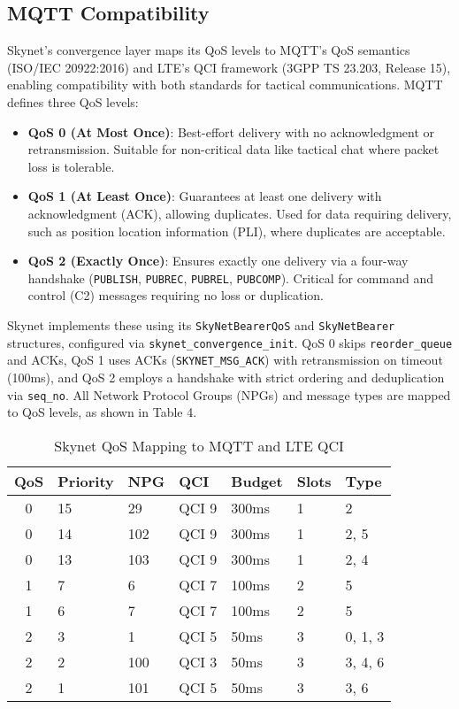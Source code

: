 \documentclass{article}
\begin{document}
\subsection{MQTT Compatibility}
Skynet’s convergence layer maps its QoS levels to MQTT’s QoS semantics (ISO/IEC 20922:2016) and LTE’s
QCI framework (3GPP TS 23.203, Release 15), enabling compatibility with both standards for tactical
communications. MQTT defines three QoS levels:
\begin{itemize}
    \item \textbf{QoS 0 (At Most Once)}: Best-effort delivery with no acknowledgment or retransmission.
          Suitable for non-critical data like tactical chat where packet loss is tolerable.
    \item \textbf{QoS 1 (At Least Once)}: Guarantees at least one delivery with acknowledgment (ACK),
          allowing duplicates. Used for data requiring delivery, such as position location information
          (PLI), where duplicates are acceptable.
    \item \textbf{QoS 2 (Exactly Once)}: Ensures exactly one delivery via a four-way handshake
          (\texttt{PUBLISH}, \texttt{PUBREC}, \texttt{PUBREL}, \texttt{PUBCOMP}). Critical for
          command and control (C2) messages requiring no loss or duplication.
\end{itemize}
Skynet implements these using its \texttt{SkyNetBearerQoS} and \texttt{SkyNetBearer} structures,
configured via \texttt{skynet\_convergence\_init}. QoS 0 skips \texttt{reorder\_queue} and ACKs, QoS 1
uses ACKs (\texttt{SKYNET\_MSG\_ACK}) with retransmission on timeout (100ms), and QoS 2 employs a
handshake with strict ordering and deduplication via \texttt{seq\_no}. All Network Protocol Groups
(NPGs) and message types are mapped to QoS levels, as shown in Table 4.

\begin{table}[ht]
\centering
\caption{Skynet QoS Mapping to MQTT and LTE QCI}
\begin{tabular}{cllllll}
\hline
\textbf{QoS} & \textbf{Priority} & \textbf{NPG} & \textbf{QCI} & \textbf{Budget} & \textbf{Slots} & \textbf{Type} \\
\hline
0 & 15 & 29  & QCI 9 & 300ms & 1 & 2 \\
0 & 14 & 102 & QCI 9 & 300ms & 1 & 2, 5 \\
0 & 13 & 103 & QCI 9 & 300ms & 1 & 2, 4 \\
1 & 7  & 6   & QCI 7 & 100ms & 2 & 5 \\
1 & 6  & 7   & QCI 7 & 100ms & 2 & 5 \\
2 & 3  & 1   & QCI 5 & 50ms  & 3 & 0, 1, 3 \\
2 & 2  & 100 & QCI 3 & 50ms  & 3 & 3, 4, 6 \\
2 & 1  & 101 & QCI 5 & 50ms  & 3 & 3, 6 \\
\hline
\end{tabular}
\end{table}
\end{document}
